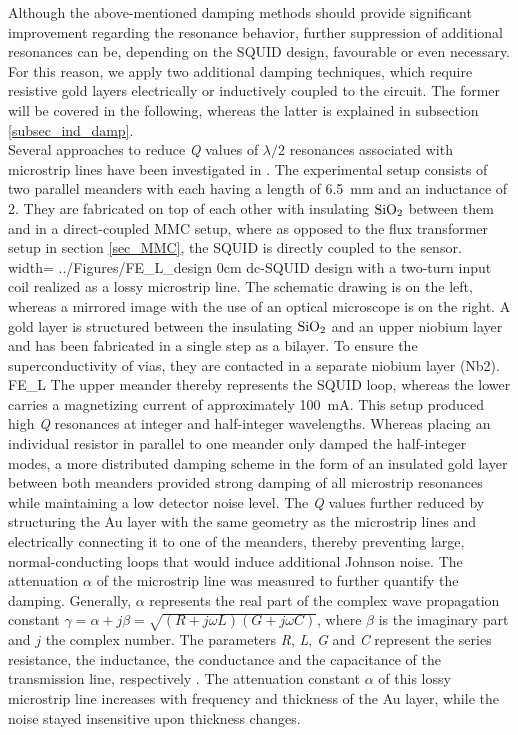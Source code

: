 Although the above-mentioned damping methods should provide significant improvement regarding the resonance behavior, further suppression of additional resonances can be, depending on the SQUID design, favourable or even necessary. For this reason, we apply two additional damping techniques, which require resistive gold layers electrically or inductively coupled to the circuit. The former will be covered in the following, whereas the latter is explained in subsection \ref{subsec_ind_damp}. \\
Several approaches to reduce \textit{Q} values of $\lambda/2$ resonances associated with microstrip lines have been investigated in \cite{Boyd2022}. The experimental setup consists of two parallel meanders with each having a length of \qty{6.5}{\milli\metre} and an inductance of \qty{2}{\nH}. They are fabricated on top of each other with insulating $\rm SiO_2$ between them and in a direct-coupled MMC setup, where as opposed to the flux transformer setup in section \ref{sec_MMC}, the SQUID is directly coupled to the sensor. 
{width=\textwidth}
{../Figures/FE_L_design}
{0cm}
{dc-SQUID design with a two-turn input coil realized as a lossy microstrip line. The schematic drawing is on the left, whereas a mirrored image with the use of an optical microscope is on the right. A gold layer is structured between the insulating $\rm SiO_2$ and an upper niobium layer and has been fabricated in a single step as a bilayer. 
To ensure the superconductivity of vias, they are contacted in a separate niobium layer (Nb2).}
{FE_L}
The upper meander thereby represents the SQUID loop, whereas the lower carries a magnetizing current of approximately \qty{100}{\milli\ampere}. This setup produced high \textit{Q} resonances at integer and half-integer wavelengths. Whereas placing an individual resistor in parallel to one meander only damped the half-integer modes, a more distributed damping scheme in the form of an insulated gold layer between both meanders provided strong damping of all microstrip resonances while maintaining a low detector noise level. The \textit{Q} values further reduced by structuring the Au layer with the same geometry as the microstrip lines and electrically connecting it to one of the meanders, thereby preventing large, normal-conducting loops that would induce additional Johnson noise. The attenuation $\alpha$ of the microstrip line was measured to further quantify the damping. Generally, $\alpha$ represents the real part of the complex wave propagation constant $\gamma=\alpha+j\beta=\sqrt{(R+j\omega L)(G+j\omega C)}$, where $\beta$ is the imaginary part and $j$ the complex number. The parameters \textit{R}, \textit{L}, \textit{G} and \textit{C} represent the series resistance, the inductance, the conductance and the capacitance of the transmission line, respectively \cite{Pozar2011}.
The attenuation constant $\alpha$ of this lossy microstrip line increases with frequency and thickness of the Au layer, while the noise stayed insensitive upon thickness changes. 

